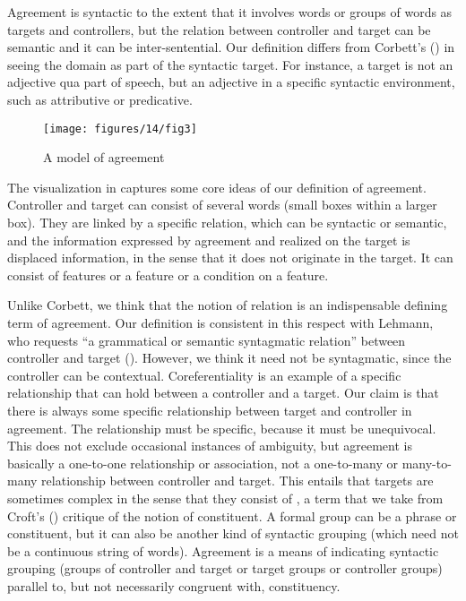 \documentclass[output=collectionpaper]{langsci/langscibook}
\begin{document}
Agreement is syntactic to the extent that it involves words or groups of words as targets and controllers, but the relation between controller and target can be semantic and it can be inter-sentential. Our definition differs from Corbett's (\citeyear[4]{Corbett2006}) in seeing the domain as part of the syntactic target. For instance, a target is not an adjective qua part of speech, but an adjective in a specific syntactic environment, such as attributive or predicative.

\begin{figure}
\caption{A model of agreement}
\texttt{[image: figures/14/fig3]}
\label{fig:WDG:3}
\end{figure}

The visualization in  captures some core ideas of our definition of agreement. Controller and target can consist of several words (small boxes within a larger box). They are linked by a specific relation, which can be syntactic or semantic, and the information expressed by agreement and realized on the target is displaced information, in the sense that it does not originate in the target. It can consist of features or a feature or a condition on a feature.

Unlike Corbett, we think that the notion of relation is an indispensable defining term of agreement. Our definition is consistent in this respect with Lehmann, who requests ``a grammatical or semantic syntagmatic relation'' between controller and target (\citealt[203]{Lehmann1982}). However, we think it need not be syntagmatic, since the controller can be contextual. Coreferentiality is an example of a specific relationship that can hold between a controller and a target. Our claim is that there is always some specific relationship between target and controller in agreement. The relationship must be specific, because it must be unequivocal. This does not exclude occasional instances of ambiguity, but agreement is basically a one-to-one relationship or association, not a one-to-many or many-to-many relationship between controller and target. This entails that targets are sometimes complex in the sense that they consist of , a term that we take from Croft's (\citeyear[190]{Croft2001}) critique of the notion of constituent. A formal group can be a phrase or constituent, but it can also be another kind of syntactic grouping (which need not be a continuous string of words). Agreement is a means of indicating syntactic grouping (groups of controller and target or target groups or controller groups) parallel to, but not necessarily congruent with, constituency.
\end{document}
